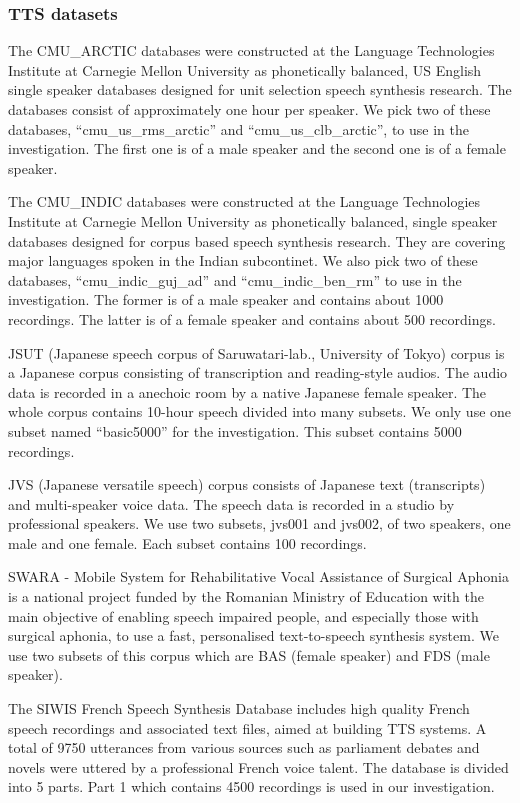 \documentclass[12pt]{article}
\begin{document}
\subsubsection{TTS datasets}
The CMU\_ARCTIC databases were constructed at the Language Technologies Institute at Carnegie Mellon University as phonetically balanced, US English single speaker databases designed for unit selection speech synthesis research. The databases consist of approximately one hour per speaker. We pick two of these databases, “cmu\_us\_rms\_arctic” and “cmu\_us\_clb\_arctic”, to use in the investigation. The first one is of a male speaker and the second one is of a female speaker.

The CMU\_INDIC databases were constructed at the Language Technologies Institute at Carnegie Mellon University as phonetically balanced, single speaker databases designed for corpus based speech synthesis research. They are covering major languages spoken in the Indian subcontinet. We also pick two of these databases, “cmu\_indic\_guj\_ad” and “cmu\_indic\_ben\_rm” to use in the investigation. The former is of a male speaker and contains about 1000 recordings. The latter is of a female speaker and contains about 500 recordings.

JSUT (Japanese speech corpus of Saruwatari-lab., University of Tokyo) corpus is a Japanese corpus consisting of transcription and reading-style audios. The audio data is recorded in a anechoic room by a native Japanese female speaker. The whole corpus contains 10-hour speech divided into many subsets. We only use one subset named “basic5000” for the investigation. This subset contains 5000 recordings.

JVS (Japanese versatile speech) corpus consists of Japanese text (transcripts) and multi-speaker voice data. The speech data is recorded in a studio by professional speakers. We use two subsets, jvs001 and jvs002, of two speakers, one male and one female. Each subset contains 100 recordings.

SWARA - Mobile System for Rehabilitative Vocal Assistance of Surgical Aphonia is a national project funded by the Romanian Ministry of Education with the main objective of enabling speech impaired people, and especially those with surgical aphonia, to use a fast, personalised text-to-speech synthesis system.
We use two subsets of this corpus which are BAS (female speaker) and FDS (male speaker).

The SIWIS French Speech Synthesis Database includes high quality French speech recordings and associated text files, aimed at building TTS systems. A total of 9750 utterances from various sources such as parliament debates and novels were uttered by a professional French voice talent. The database is divided into 5 parts. Part 1 which contains 4500 recordings is used in our investigation.
\end{document}
